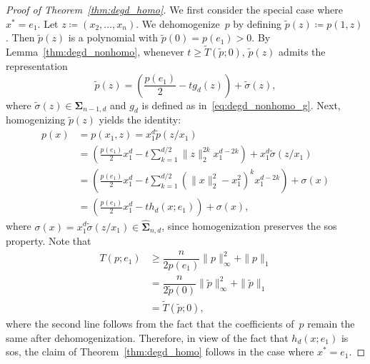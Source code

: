 \documentclass[12pt]{article}
\newcommand{\SOS}{\mathbf{\Sigma}}
\newcommand{\HSOS}{\widehat{\mathbf{\Sigma}}}
\newcommand{\defeq}{\coloneq}
\theoremstyle{remark}
\begin{document}
\begin{proof}[Proof of Theorem~\ref{thm:degd_homo}]
We first consider the special case where $x^*=e_1$. Let $z\defeq(x_2,\ldots,x_n)$. We dehomogenize~$p$ by defining $\tilde{p}(z)\defeq p(1,z)$. Then $\tilde{p}(z)$ is a polynomial with $\tilde{p}(0)=p(e_1)>0$. 
By Lemma~\ref{thm:degd_nonhomo}, whenever $t\ge \tilde{T}(\tilde{p};0)$, $\tilde{p}(z)$ admits the representation
\[\tilde{p}(z)=\left(\frac{p(e_1)}{2}-tg_d(z)\right)+\tilde{\sigma}(z),\]
where $\tilde{\sigma}(z)\in\SOS_{n-1,d}$ and $g_d$ is defined as in~\eqref{eq:degd_nonhomo_g}. 
Next, homogenizing $\tilde{p}(z)$ yields the identity:
\[\begin{aligned}
p(x)&=p(x_1,z)=x_1^d \tilde{p}(z/x_1)\\
&=\left(\frac{p(e_1)}{2}x_1^d-t\sum\limits_{k=1}^{d/2}\|z\|_2^{2k}x_1^{d-2k}\right)+x_1^d \tilde{\sigma}(z/x_1)\\
&=\left(\frac{p(e_1)}{2}x_1^d-t\sum\limits_{k=1}^{d/2}(\|x\|_2^2-x_1^2)^{k}x_1^{d-2k}\right)+\sigma(x)\\
&=\left(\frac{p(e_1)}{2}x_1^d-th_d(x;e_1)\right)+\sigma(x),
\end{aligned}\]
where $\sigma(x)=x_1^d \tilde{\sigma}(z/x_1)\in\HSOS_{n,d}$, since homogenization preserves the sos property. Note that
\[\begin{aligned}
T(p;e_1)&\ge \dfrac{n}{2p(e_1)}\|p\|_{\infty}^2+\|p\|_1\\
&= \dfrac{n}{2\tilde{p}(0)}\|\tilde{p}\|^2_{\infty} + \|\tilde{p}\|_1\\
&=\tilde{T}(\tilde{p};0),
\end{aligned}\]
where the second line follows from the fact that the coefficients of~$p$ remain the same after dehomogenization. 
Therefore, in view of the fact that $h_d(x;e_1)$ is sos, the claim of Theorem~\ref{thm:degd_homo} follows in the case where $x^*=e_1$.



\end{proof}
\end{document}
